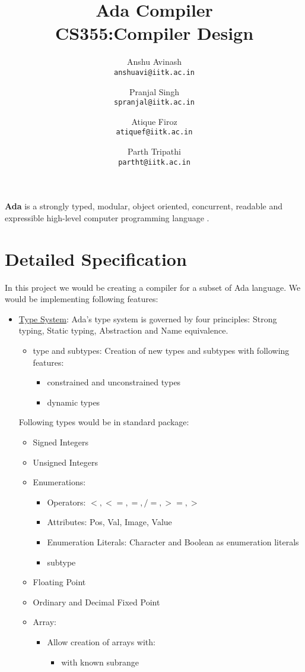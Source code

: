 \documentclass{article}
\title{
Ada Compiler \\
CS355:Compiler Design
}
\author{
Anshu Avinash\\
\texttt{anshuavi@iitk.ac.in}
\and
Pranjal Singh\\
\texttt{spranjal@iitk.ac.in}
\and
Atique Firoz\\
\texttt{atiquef@iitk.ac.in}
\and
Parth Tripathi\\
\texttt{partht@iitk.ac.in}
}
\begin{document}
\maketitle

\textbf{Ada} is a strongly typed, modular, object oriented, concurrent, readable and expressible high-level computer programming language \cite{AdaIC}. 
\section{Detailed Specification}
In this project we would be creating a compiler for a subset of Ada language. We would be implementing following features:
\begin{itemize}
	\item \uline{Type System}: Ada's type system is governed by four principles: Strong typing, Static typing, Abstraction and Name equivalence.
	\begin{itemize}
		\item type and subtypes: Creation of new types and subtypes with following features:
		\begin{itemize}
			\item constrained and unconstrained types
			\item dynamic types
		\end{itemize}
	\end{itemize}
	Following types would be in standard package:
	\begin{itemize}
		\item Signed Integers
		\item Unsigned Integers
		\item Enumerations:
			\begin{itemize}
				\item Operators: $<,<=,=,/=,>=,>$
				\item Attributes: Pos, Val, Image, Value
				\item Enumeration Literals: Character and Boolean as enumeration literals
				\item subtype
			\end{itemize}
		\item Floating Point
		\item Ordinary and Decimal Fixed Point
		\item Array:
		\begin{itemize}
		\item Allow creation of arrays with:
			\begin{itemize}
				\item with known subrange

\end{itemize}
\end{itemize}
\end{itemize}
\end{itemize}
\end{document}
